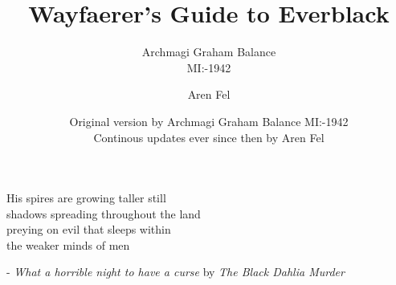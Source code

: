\documentclass[11pt,a4paper,twocolumn]{scrbook}
\title{Wayfaerer's Guide to Everblack}
\author{
  Archmagi Graham Balance\\
  MI:-1942
  \and
  Aren Fel
}
\date{Original version by Archmagi Graham Balance MI:-1942\\
  Continous updates ever since then by Aren Fel
  }
\newcommand\songquote[3]{
  \onecolumn
  \begin{center}#3\end{center} - \emph{#2} by \emph{#1}
}
\begin{document}
\maketitle

\songquote{The Black Dahlia Murder}{What a horrible night to have a curse}
          {His spires are growing taller still\\shadows spreading
            throughout the land\\preying on evil that sleeps within\\the
            weaker minds of men}
\newpage




\end{document}
